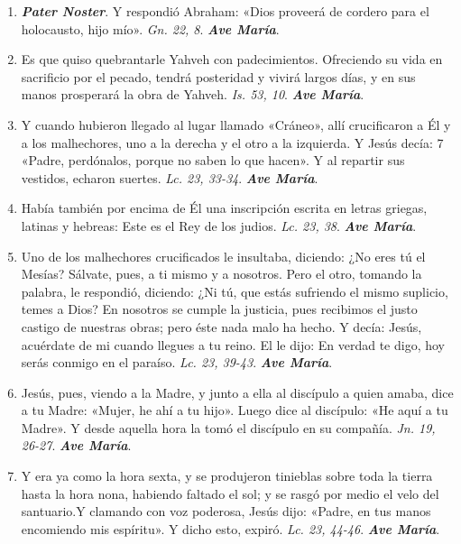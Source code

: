 \documentclass[../../devocionario.tex]{subfiles}
\begin{document}
    \begin{enumerate}
    
        \item \textbf{\emph{Pater Noster}}. Y respondió Abraham: «Dios proveerá de cordero para el holocausto, hijo mío». \emph{Gn. 22, 8}. \textbf{\emph{Ave María}}.
        
        \item Es que quiso quebrantarle Yahveh con padecimientos. Ofreciendo su vida en sacrificio por el pecado, tendrá posteridad y vivirá largos días, y en sus manos
            prosperará la obra de Yahveh. \emph{Is. 53, 10}. \textbf{\emph{Ave María}}.

        \item Y cuando hubieron llegado al lugar llamado «Cráneo», allí crucificaron a Él y a los malhechores, uno a la derecha y el otro a la izquierda. Y Jesús decía: 7
            «Padre, perdónalos, porque no saben lo que hacen». Y al repartir sus vestidos, echaron suertes. \emph{Lc. 23, 33-34}. \textbf{\emph{Ave María}}.

        \item Había también por encima de Él una inscripción escrita en letras griegas, latinas y hebreas: Este es el Rey de los judios. \emph{Lc. 23, 38}. \textbf{\emph{Ave María}}.

        \item Uno de los malhechores crucificados le insultaba, diciendo: ¿No eres tú el Mesías? Sálvate, pues, a ti mismo y a nosotros. Pero el otro,
            tomando la palabra, le respondió, diciendo: ¿Ni tú, que estás sufriendo el mismo suplicio, temes a Dios? En nosotros se cumple la justicia, pues
            recibimos el justo castigo de nuestras obras; pero éste nada malo ha hecho. Y decía: Jesús, acuérdate de mi cuando llegues a tu reino. El le dijo: En verdad te digo, 
            hoy serás conmigo en el paraíso. \emph{Lc. 23, 39-43}. \textbf{\emph{Ave María}}.

        \item Jesús, pues, viendo a la Madre, y junto a ella al discípulo a quien amaba, dice a tu Madre: «Mujer, he ahí a tu hijo». 
            Luego dice al discípulo: «He aquí a tu Madre». Y desde aquella hora la tomó el discípulo en su compañía. \emph{Jn. 19, 26-27}. \textbf{\emph{Ave María}}.

        \item Y era ya como la hora sexta, y se produjeron tinieblas sobre toda la tierra hasta la hora nona, habiendo faltado el sol; 
            y se rasgó por medio el velo del santuario.Y clamando con voz poderosa, Jesús dijo: «Padre, en tus manos encomiendo mis espíritu». Y dicho esto, expiró. 
            \emph{Lc. 23, 44-46}. \textbf{\emph{Ave María}}.


\end{enumerate}
\end{document}
